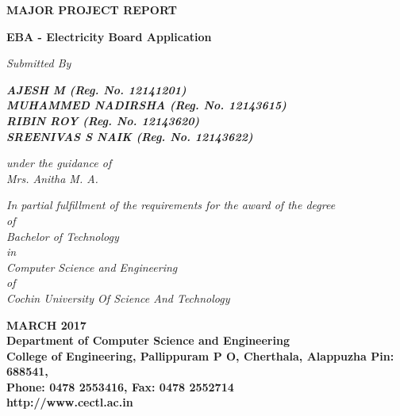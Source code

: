 \documentclass[12pt,a4paper,oneside]{report}
\begin{document}
\begin{titlepage}
\begin{center}

\large{\textbf{MAJOR PROJECT REPORT}}\\
\begin{singlespace}
\LARGE{\textbf{EBA - Electricity Board Application }}\\
\end{singlespace}


\Large{\textit{Submitted By }}\\
\begin{singlespace}
\Large{\textit{\textbf{AJESH M (Reg. No. 12141201)}}} \\
\Large{\textit{\textbf{MUHAMMED NADIRSHA (Reg. No. 12143615)}}} \\
\Large{\textit{\textbf{RIBIN ROY (Reg. No. 12143620)}}} \\
\Large{\textit{\textbf{SREENIVAS S NAIK (Reg. No. 12143622)}}} \\
\end{singlespace}
\Large{\textit{\textit{under the guidance of}}}\\
\Large{\textit{Mrs. Anitha M. A.}}\\
\begin{singlespace}
\large{\textit{In partial fulfillment of the requirements for the award of the degree}\\
\large{ \textit{of}}\\
\large{\textit{Bachelor of Technology} }\\
\large{\textit{in}}\\
\large{\textit{Computer Science and Engineering}}\\
\large{\textit{of}}\\
\large{\textit{Cochin University Of Science And Technology }}}\\
\end{singlespace}
\begin{figure}[h]
\begin{center}
\end{center}
\end{figure}
\begin{singlespace}

\Large{\textbf{MARCH 2017\\Department of Computer Science and Engineering\\College of Engineering, Pallippuram P O, Cherthala, Alappuzha Pin: 688541, \\Phone: 0478 2553416, Fax: 0478 2552714\\http://www.cectl.ac.in}}
\end{singlespace}
\end{center}
\end{titlepage}
\end{document}
